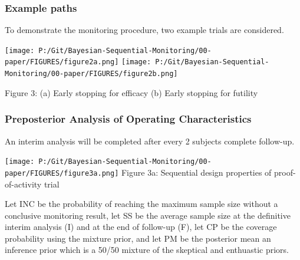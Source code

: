 \documentclass[12pt]{article}
\begin{document}
\subsubsection{Example paths}
To demonstrate the monitoring procedure, two example trials are considered. 
\begin{center}
\texttt{[image: P:/Git/Bayesian-Sequential-Monitoring/00-paper/FIGURES/figure2a.png]}
\texttt{[image: P:/Git/Bayesian-Sequential-Monitoring/00-paper/FIGURES/figure2b.png]}

Figure 3: (a) Early stopping for efficacy (b) Early stopping for futility
\end{center}
\newpage
\subsubsection{Preposterior Analysis of Operating Characteristics}
An interim analysis will be completed after every 2 subjects complete follow-up.
\begin{center}
\texttt{[image: P:/Git/Bayesian-Sequential-Monitoring/00-paper/FIGURES/figure3a.png]}
Figure 3a: Sequential design properties of proof-of-activity trial
\end{center}
Let INC be the probability of reaching the maximum sample size without a conclusive monitoring result, let SS be the average sample size at the definitive interim analysis (I) and at the end of follow-up (F), let CP be the coverage probability using the mixture prior, and let PM be the posterior mean an inference prior which is a 50/50 mixture of the skeptical and enthuastic priors.
\end{document}
